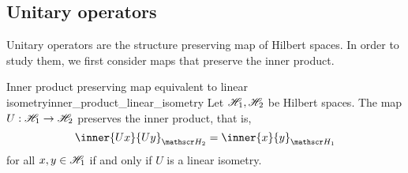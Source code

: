 \subsection{Unitary operators}
Unitary operators are the structure preserving map of Hilbert spaces. In order to study them, we first consider maps that preserve the inner product.
\begin{theorem}{Inner product preserving map equivalent to linear isometry}{inner_product_linear_isometry}
    Let \(\mathscr{H}_1, \mathscr{H}_2\) be Hilbert spaces. The map \(U : \mathscr{H}_1 \to \mathscr{H}_2\) preserves the inner product, that is,
    \begin{equation*}
        \inner{Ux}{Uy}_{\hilbert_2} = \inner{x}{y}_{\hilbert_1}
    \end{equation*}
    for all \(x, y \in \mathscr{H}_1\) if and only if \(U\) is a linear isometry.
\end{theorem}

